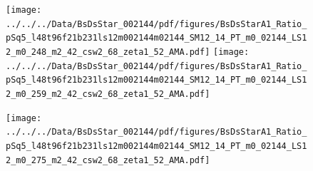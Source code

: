 \documentclass[a4paper,10pt]{article}
\begin{document}
\clearpage
\begin{figure}[p]
 \texttt{[image: ../../../Data/BsDsStar\_002144/pdf/figures/BsDsStarA1\_Ratio\_pSq5\_l48t96f21b231ls12m002144m02144\_SM12\_14\_PT\_m0\_02144\_LS12\_m0\_248\_m2\_42\_csw2\_68\_zeta1\_52\_AMA.pdf]} 
 \texttt{[image: ../../../Data/BsDsStar\_002144/pdf/figures/BsDsStarA1\_Ratio\_pSq5\_l48t96f21b231ls12m002144m02144\_SM12\_14\_PT\_m0\_02144\_LS12\_m0\_259\_m2\_42\_csw2\_68\_zeta1\_52\_AMA.pdf]} 
 \end{figure}
\begin{figure}[p]
 \texttt{[image: ../../../Data/BsDsStar\_002144/pdf/figures/BsDsStarA1\_Ratio\_pSq5\_l48t96f21b231ls12m002144m02144\_SM12\_14\_PT\_m0\_02144\_LS12\_m0\_275\_m2\_42\_csw2\_68\_zeta1\_52\_AMA.pdf]} 
 \end{figure}
\clearpage
\end{document}
